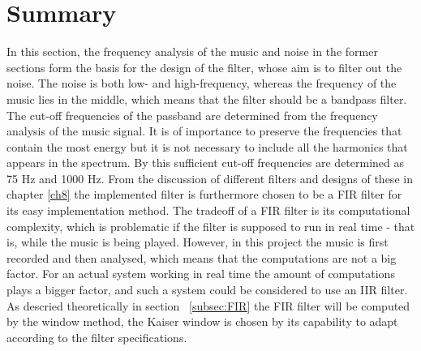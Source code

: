 \section{Summary} \label{sec:filtervalg}
In this section, the frequency analysis of the music and noise in the former sections form the basis for the design of the filter, whose aim is to filter out the noise. The noise is both low- and high-frequency, whereas the frequency of the music lies in the middle, which means that the filter should be a bandpass filter. The cut-off frequencies of the passband are determined from the frequency analysis of the music signal. It is of importance to preserve the frequencies that contain the most energy but it is not necessary to include all the harmonics that appears in the spectrum. By this sufficient cut-off frequencies are determined as 75 Hz and 1000 Hz.
From the discussion of different filters and designs of these in chapter \ref{ch8} the implemented filter is furthermore chosen to be a FIR filter for its easy implementation method. The tradeoff of a FIR filter is its computational complexity, which is problematic if the filter is supposed to run in real time - that is, while the music is being played. However, in this project the music is first recorded and then analysed, which means that the computations are not a big factor. For an actual system working in real time the amount of computations plays a bigger factor, and such a system could be considered to use an IIR filter.\\
As descried theoretically in section ~\ref{subsec:FIR} the FIR filter will be computed by the window method, the Kaiser window is chosen by its capability to adapt according to the filter specifications.     